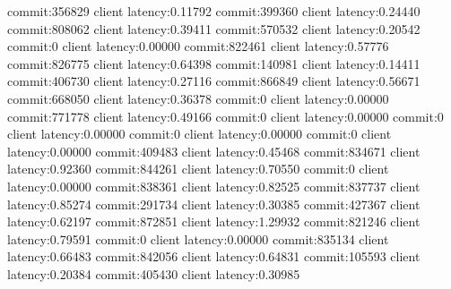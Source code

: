 commit:356829 client latency:0.11792
commit:399360 client latency:0.24440
commit:808062 client latency:0.39411
commit:570532 client latency:0.20542
commit:0 client latency:0.00000
commit:822461 client latency:0.57776
commit:826775 client latency:0.64398
commit:140981 client latency:0.14411
commit:406730 client latency:0.27116
commit:866849 client latency:0.56671
commit:668050 client latency:0.36378
commit:0 client latency:0.00000
commit:771778 client latency:0.49166
commit:0 client latency:0.00000
commit:0 client latency:0.00000
commit:0 client latency:0.00000
commit:0 client latency:0.00000
commit:409483 client latency:0.45468
commit:834671 client latency:0.92360
commit:844261 client latency:0.70550
commit:0 client latency:0.00000
commit:838361 client latency:0.82525
commit:837737 client latency:0.85274
commit:291734 client latency:0.30385
commit:427367 client latency:0.62197
commit:872851 client latency:1.29932
commit:821246 client latency:0.79591
commit:0 client latency:0.00000
commit:835134 client latency:0.66483
commit:842056 client latency:0.64831
commit:105593 client latency:0.20384
commit:405430 client latency:0.30985